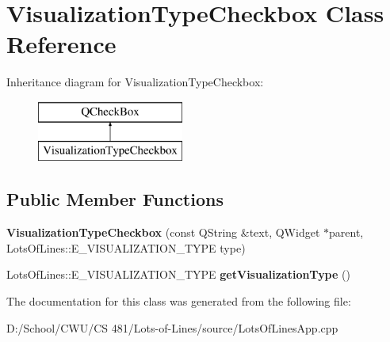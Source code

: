 \hypertarget{class_visualization_type_checkbox}{}\section{Visualization\+Type\+Checkbox Class Reference}
\label{class_visualization_type_checkbox}
Inheritance diagram for Visualization\+Type\+Checkbox\+:\begin{figure}[H]
\begin{center}
\leavevmode
\includegraphics[height=2.000000cm]{class_visualization_type_checkbox}
\end{center}
\end{figure}
\subsection*{Public Member Functions}
\begin{DoxyCompactItemize}
\item 
{\bfseries Visualization\+Type\+Checkbox} (const Q\+String \&text, Q\+Widget $\ast$parent, Lots\+Of\+Lines\+::\+E\+\_\+\+V\+I\+S\+U\+A\+L\+I\+Z\+A\+T\+I\+O\+N\+\_\+\+T\+Y\+PE type)\hypertarget{class_visualization_type_checkbox_ae91c996fb27d74342b3e354c2f8f5bb6}{}\label{class_visualization_type_checkbox_ae91c996fb27d74342b3e354c2f8f5bb6}

\item 
Lots\+Of\+Lines\+::\+E\+\_\+\+V\+I\+S\+U\+A\+L\+I\+Z\+A\+T\+I\+O\+N\+\_\+\+T\+Y\+PE {\bfseries get\+Visualization\+Type} ()\hypertarget{class_visualization_type_checkbox_a68e39c617215ff97a3c113c44cca6031}{}\label{class_visualization_type_checkbox_a68e39c617215ff97a3c113c44cca6031}

\end{DoxyCompactItemize}


The documentation for this class was generated from the following file\+:\begin{DoxyCompactItemize}
\item 
D\+:/\+School/\+C\+W\+U/\+C\+S 481/\+Lots-\/of-\/\+Lines/source/Lots\+Of\+Lines\+App.\+cpp\end{DoxyCompactItemize}
